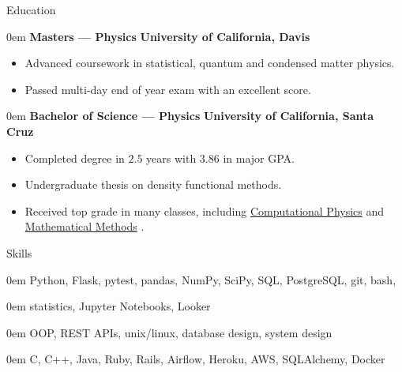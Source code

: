 \documentclass[11pt,a4paper]{article}
\newenvironment{headedsection}[2]{
    \begin{addmargin}[0.5em]{0em}
    {\large\bfseries #1} \hfill {\bfseries #2}%
    \begin{itemize}
        [label={}, topsep=0pt, itemsep=1.5pt, parsep=0pt, leftmargin=1.5em]
}{
    \end{itemize}
    \end{addmargin}
    \medskip
}
\newcommand{\ComputationalPhysics}{
  \href{http://young.physics.ucsc.edu/115/}{Computational Physics}
}
\newcommand{\MathematicalMethods}{
  \href{http://scipp.ucsc.edu/~haber/ph116C/}{Mathematical Methods}
}
\begin{document}
\begin{mysection}{Education}
  \begin{headedsection}{Masters --- Physics}
        {University of California, Davis}

    \item Advanced coursework in statistical, quantum and condensed matter
          physics.
    \item Passed multi-day end of year exam with an excellent score.

  \end{headedsection}

  \begin{headedsection}{Bachelor of Science --- Physics}
        {University of California, Santa Cruz}

    \item Completed degree in $2.5$ years with $3.86$ in major GPA.\@
    \item Undergraduate thesis on density functional methods.
    \item Received top grade in many classes, including \ComputationalPhysics{}
          and \MathematicalMethods{}.

  \end{headedsection}
\end{mysection}

\begin{mysection}{Skills}

  \begin{addmargin}[0.5em]{0em}
    \phantom{\large\bfseries Software Fundamentals: \quad}
    Python, Flask, pytest, pandas, NumPy, SciPy, SQL, PostgreSQL, git, bash,
  \end{addmargin}

  \begin{addmargin}[0.5em]{0em}
    \makebox[0pt][l]{}
    \phantom{\large\bfseries Software Fundamentals: \quad}
    statistics, Jupyter Notebooks, Looker
  \end{addmargin}

  \begin{addmargin}[0.5em]{0em}
    \phantom{\large\bfseries Software Fundamentals: \quad}
    OOP, REST APIs, unix/linux, database design, system design
  \end{addmargin}

  \begin{addmargin}[0.5em]{0em}
    \phantom{\large\bfseries Software Fundamentals: \quad}
    C, C++, Java, Ruby, Rails, Airflow, Heroku, AWS, SQLAlchemy, Docker
  \end{addmargin}

\end{mysection}
\end{document}
